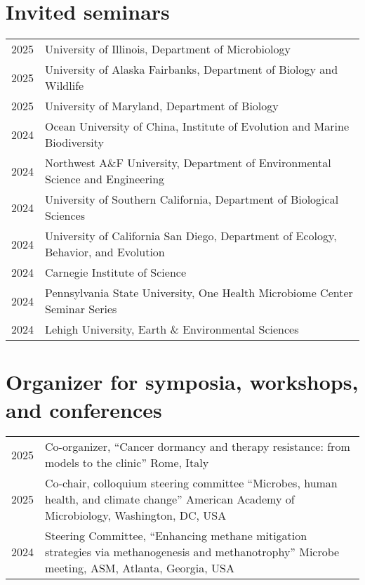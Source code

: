\documentclass[11pt]{article}
\begin{document}
\section*{Invited seminars}
\vspace{-1.25em} %
\noindent
\begin{longtable}{@{}p{3em}@{\hspace{1.5em}}p{}@{}}
2025 & University of Illinois, Department of Microbiology \\

2025 & University of Alaska Fairbanks, Department of Biology and Wildlife \\

2025 & University of Maryland, Department of Biology \\

2024 & Ocean University of China, Institute of Evolution and Marine Biodiversity \\

2024 & Northwest A\&F University, Department of Environmental Science and Engineering \\

2024 & University of Southern California, Department of Biological Sciences \\

2024 & University of California San Diego, Department of Ecology, Behavior, and Evolution \\

2024 & Carnegie Institute of Science \\

2024 & Pennsylvania State University, One Health Microbiome Center Seminar Series \\

2024 & Lehigh University, Earth \& Environmental Sciences \\
\end{longtable}

\section*{Organizer for symposia, workshops, and conferences}
\vspace{-1.25em} %
\noindent
\begin{longtable}{@{}p{3em}@{\hspace{1.5em}}p{}@{}}

2025 & Co-organizer, “Cancer dormancy and therapy resistance: from models to the clinic” Rome, Italy \\

2025 & Co-chair, colloquium steering committee “Microbes, human health, and climate change” American Academy of Microbiology, Washington, DC, USA \\

2024 & Steering Committee, “Enhancing methane mitigation strategies via methanogenesis and methanotrophy” Microbe meeting, ASM, Atlanta, Georgia, USA \\
\end{longtable}
\end{document}
